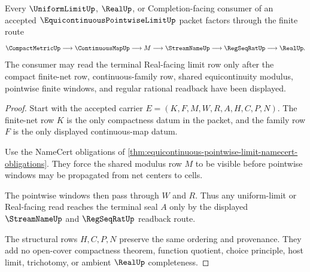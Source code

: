 \begin{theorem}
\label{thm:equicontinuous-pointwise-limit-finite-net-route}
Every $\UniformLimitUp$, $\RealUp$, or Completion-facing consumer of an accepted $\EquicontinuousPointwiseLimitUp$ packet factors through the finite route
$$
\CompactMetricUp\longrightarrow \ContinuousMapUp\longrightarrow M\longrightarrow \StreamNameUp\longrightarrow \RegSeqRatUp\longrightarrow \RealUp .
$$
The consumer may read the terminal Real-facing limit row only after the compact finite-net row, continuous-family row, shared equicontinuity modulus, pointwise finite windows, and regular rational readback have been displayed.
\end{theorem}
\begin{proof}
Start with the accepted carrier $E=(K,F,M,W,R,A,H,C,P,N)$. The finite-net row $K$ is the only compactness datum in the packet, and the family row $F$ is the only displayed continuous-map datum.

Use the NameCert obligations of \autoref{thm:equicontinuous-pointwise-limit-namecert-obligations}. They force the shared modulus row $M$ to be visible before pointwise windows may be propagated from net centers to cells.

The pointwise windows then pass through $W$ and $R$. Thus any uniform-limit or Real-facing read reaches the terminal seal $A$ only by the displayed $\StreamNameUp$ and $\RegSeqRatUp$ readback route.

The structural rows $H,C,P,N$ preserve the same ordering and provenance. They add no open-cover compactness theorem, function quotient, choice principle, host limit, trichotomy, or ambient $\RealUp$ completeness.
\end{proof}




